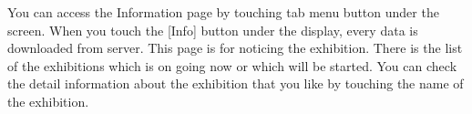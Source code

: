 \documentclass[conference]{IEEEtran}
\begin{document}
You can access the Information page by touching tab menu button under the screen. When you touch the [Info] button under the display, every data is downloaded from server. This page is for noticing the exhibition. There is the list of the exhibitions which is on going now or which will be started. You can check the detail information about the exhibition that you like by touching the name of the exhibition. \\\\\\\\\\\\\\\\\\\\\\\\\\\\
\end{document}
